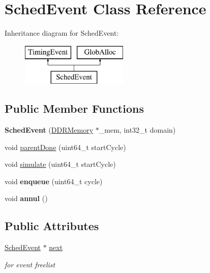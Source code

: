 \hypertarget{classSchedEvent}{\section{Sched\-Event Class Reference}
\label{classSchedEvent}
}
Inheritance diagram for Sched\-Event\-:\begin{figure}[H]
\begin{center}
\leavevmode
\includegraphics[height=2.000000cm]{classSchedEvent}
\end{center}
\end{figure}
\subsection*{Public Member Functions}
\begin{DoxyCompactItemize}
\item 
\hypertarget{classSchedEvent_a072a1e4ed6048b8c6c65daac23094f39}{{\bfseries Sched\-Event} (\hyperlink{classDDRMemory}{D\-D\-R\-Memory} $\ast$\-\_\-mem, int32\-\_\-t domain)}\label{classSchedEvent_a072a1e4ed6048b8c6c65daac23094f39}

\item 
void \hyperlink{classSchedEvent_aabd0b9e2eedd6a393aa9fbdb45d8fab4}{parent\-Done} (uint64\-\_\-t start\-Cycle)
\item 
void \hyperlink{classSchedEvent_a2b7f25cd8cd2e344f468b7190db9e997}{simulate} (uint64\-\_\-t start\-Cycle)
\item 
\hypertarget{classSchedEvent_ad6adc031ae1c64f784034efb3d619e97}{void {\bfseries enqueue} (uint64\-\_\-t cycle)}\label{classSchedEvent_ad6adc031ae1c64f784034efb3d619e97}

\item 
\hypertarget{classSchedEvent_a12c56bd0b5ce1c9646d634ccc2c606d8}{void {\bfseries annul} ()}\label{classSchedEvent_a12c56bd0b5ce1c9646d634ccc2c606d8}

\end{DoxyCompactItemize}
\subsection*{Public Attributes}
\begin{DoxyCompactItemize}
\item 
\hypertarget{classSchedEvent_a1a4d00f317662519887844381182c129}{\hyperlink{classSchedEvent}{Sched\-Event} $\ast$ \hyperlink{classSchedEvent_a1a4d00f317662519887844381182c129}{next}}\label{classSchedEvent_a1a4d00f317662519887844381182c129}

\begin{DoxyCompactList}\small\item\em for event freelist \end{DoxyCompactList}\end{DoxyCompactItemize}

